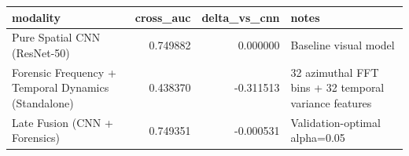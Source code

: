 \begin{tabular}{lrrl}
\toprule
modality & cross_auc & delta_vs_cnn & notes \\
\midrule
Pure Spatial CNN (ResNet-50) & 0.749882 & 0.000000 & Baseline visual model \\
Forensic Frequency + Temporal Dynamics (Standalone) & 0.438370 & -0.311513 & 32 azimuthal FFT bins + 32 temporal variance features \\
Late Fusion (CNN + Forensics) & 0.749351 & -0.000531 & Validation-optimal alpha=0.05 \\
\bottomrule
\end{tabular}
